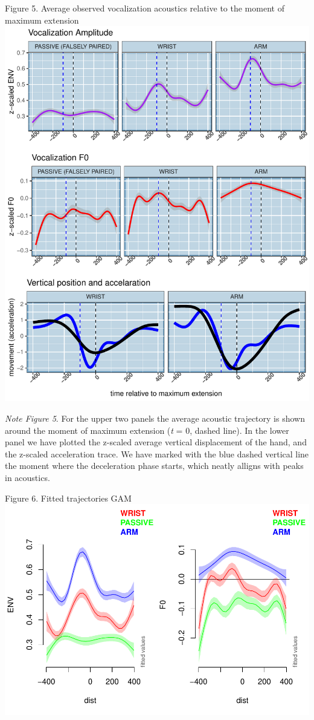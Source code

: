 \documentclass[
  man, noextraspace,floatsintext]{apa6}
\begin{document}
\pagebreak
Figure 5. Average observed vocalization acoustics relative to the moment of maximum extension\\
\includegraphics{GS_physics_in_fluid_speech_files/figure-latex/movementplot_avF0_avENV-1.pdf}

\emph{Note Figure 5}. For the upper two panels the average acoustic trajectory is shown around the moment of maximum extension (\emph{t} = 0, dashed line). In the lower panel we have plotted the z-scaled average vertical displacement of the hand, and the z-scaled acceleration trace. We have marked with the blue dashed vertical line the moment where the deceleration phase starts, which neatly alligns with peaks in acoustics.

Figure 6. Fitted trajectories GAM
\includegraphics{GS_physics_in_fluid_speech_files/figure-latex/table_anddiff-1.pdf}
\end{document}
